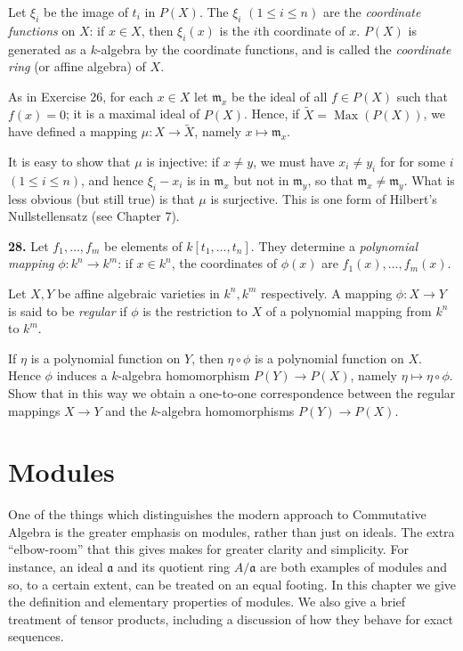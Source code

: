 
Let \(\xi_i\) be the image of \(t_i\) in \(P(X)\). The \(\xi_i\) \((1\leq i\leq n)\) are the \emph{coordinate functions} on \(X\): if \(x\in X\), then \(\xi_i(x)\) is the \(i\)th coordinate of \(x\). \(P(X)\) is generated as a \(k\)-algebra by the coordinate functions, and is called the \emph{coordinate ring} (or affine algebra) of \(X\).

As in Exercise 26, for each \(x\in X\) let \(\mathfrak m_x\) be the ideal of all \(f\in P(X)\) such that \(f(x)=0\); it is a maximal ideal of \(P(X)\). Hence, if \(\widetilde X=\operatorname{Max}(P(X))\), we have defined a mapping \(\mu:X\to\widetilde X\), namely \(x\mapsto\mathfrak m_x\).

It is easy to show that \(\mu\) is injective: if \(x\neq y\), we must have \(x_i\neq y_i\) for for some \(i\) \((1\leq i\leq n)\), and hence \(\xi_i-x_i\) is in \(\mathfrak m_x\) but not in \(\mathfrak m_y\), so that \(\mathfrak m_x\neq\mathfrak m_y\). What is less obvious (but still true) is that \(\mu\) is surjective. This is one form of Hilbert's Nullstellensatz (see Chapter 7).

\noindent\textbf{28.} Let \(f_1,\ldots,f_m\) be elements of \(k[t_1,\ldots,t_n]\). They determine a \emph{polynomial mapping} \(\phi:k^n\to k^m\): if \(x\in k^n\), the coordinates of \(\phi(x)\) are \(f_1(x),\ldots,f_m(x)\).

Let \(X,Y\) be affine algebraic varieties in \(k^n,k^m\) respectively. A mapping \(\phi:X\to Y\) is said to be \emph{regular} if \(\phi\) is the restriction to \(X\) of a polynomial mapping from \(k^n\) to \(k^m\).

If \(\eta\) is a polynomial function on \(Y\), then \(\eta\circ\phi\) is a polynomial function on \(X\). Hence \(\phi\) induces a \(k\)-algebra homomorphism \(P(Y)\to P(X)\), namely \(\eta\mapsto\eta\circ\phi\). Show that in this way we obtain a one-to-one correspondence between the regular mappings \(X\to Y\) and the \(k\)-algebra homomorphisms \(P(Y)\to P(X)\).

\section{Modules}

One of the things which distinguishes the modern approach to Commutative Algebra is the greater emphasis on modules, rather than just on ideals. The extra ``elbow-room'' that this gives makes for greater clarity and simplicity. For instance, an ideal \(\mathfrak a\) and its quotient ring \(A/\mathfrak a\) are both examples of modules and so, to a certain extent, can be treated on an equal footing. In this chapter we give the definition and elementary properties of modules. We also give a brief treatment of tensor products, including a discussion of how they behave for exact sequences.

